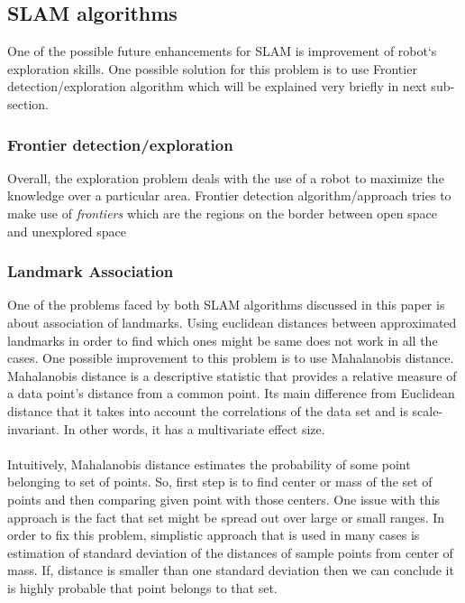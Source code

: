 \documentclass{ba-kecs}
\numberwithin{figure}{section}
\numberwithin{equation}{section}
\begin{document}
\subsection{SLAM algorithms}	
	One of the possible future enhancements for SLAM is improvement of robot`s exploration skills. One possible solution for this problem is to use Frontier detection/exploration algorithm which will be explained very briefly in next sub-section.
	
\subsubsection{Frontier detection/exploration}
	Overall, the exploration problem deals with the use of a robot to maximize the knowledge over a particular area. Frontier detection algorithm/approach tries to make use of \textit{frontiers} which are the regions on the border between open space and unexplored space \cite{frontier}
	
\subsubsection{Landmark Association}
One of the problems faced by both SLAM algorithms discussed in this paper is about association of landmarks. Using euclidean distances between approximated landmarks in order to find which ones might be same does not work in all the cases. One possible improvement to this problem is to use Mahalanobis distance. Mahalanobis distance is a descriptive statistic that provides a relative measure of a data point's distance from a common point. Its main difference from Euclidean distance that it takes into account the correlations of the data set and is scale-invariant. In other words, it has a multivariate effect size.\\ \\
Intuitively, Mahalanobis distance estimates the probability of some point belonging to set of points. So, first step is to find center or mass of the set of points and then comparing given point with those centers. One issue with this approach is the fact that set might be spread out over large or small ranges. In order to fix this problem, simplistic approach that is used in many cases is estimation of standard deviation of the distances of sample points from center of mass. If, distance is smaller than one standard deviation then we can conclude it is highly probable that point belongs to that set.
\end{document}
